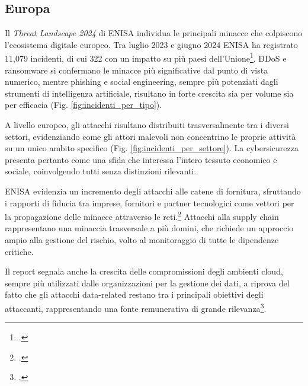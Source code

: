 \subsection{Europa}
Il \textit{Threat Landscape 2024} di ENISA individua le principali minacce che colpiscono l’ecosistema digitale
europeo. Tra luglio 2023 e giugno 2024 ENISA ha registrato 11,079 incidenti, di cui 322 con un impatto su
più paesi dell'Unione\footcite[p. 12]{enisa-threat-landscape}. DDoS e ransomware si confermano le minacce più
significative dal punto di vista numerico, mentre phishing e social engineering, sempre più potenziati dagli strumenti di intelligenza artificiale, 
risultano in forte crescita sia per volume sia per efficacia (Fig. \ref{fig:incidenti_per_tipo}). 


A livello europeo, gli attacchi risultano distribuiti trasversalmente tra i diversi settori, 
evidenziando come gli attori malevoli non concentrino le proprie attività su un unico ambito 
specifico (Fig. \ref{fig:incidenti_per_settore}). La cybersicurezza presenta pertanto come 
una sfida che interessa l’intero tessuto economico e sociale, coinvolgendo tutti senza distinzioni rilevanti.


ENISA evidenzia un incremento degli attacchi alle catene di fornitura, sfruttando i rapporti di fiducia 
tra imprese, fornitori e partner tecnologici come vettori per la propagazione delle minacce attraverso 
le reti.\footcite[pp. 12--13]{enisa-threat-landscape} Attacchi alla supply chain rappresentano una minaccia trasversale 
a più domini, che richiede un approccio ampio alla gestione del rischio, volto al monitoraggio di tutte le dipendenze critiche.

Il report segnala anche la crescita delle compromissioni degli ambienti cloud, sempre più 
utilizzati dalle organizzazioni per la gestione dei dati, a riprova del fatto che gli attacchi data-related restano 
tra i principali obiettivi degli attaccanti, rappresentando una fonte remunerativa di grande rilevanza\footcite[p. 17]{enisa-threat-landscape}.

